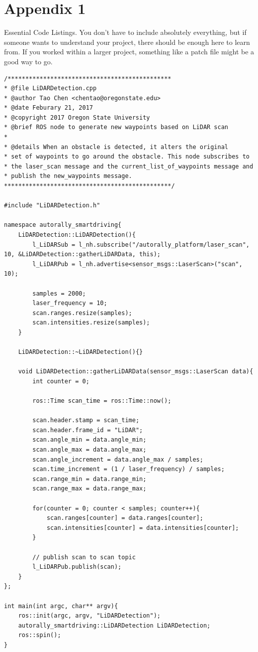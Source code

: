 \documentclass[compsoc,draftclsnofoot,onecolumn,10pt]{IEEEtran}
\begin{document}
\section{Appendix 1}
Essential Code Listings. You don't have to include absolutely everything, but if someone wants to understand your project, there should be enough here to learn from. If you worked within a larger project, something like a patch file might be a good way to go.
\begin{lstlisting}[frame=single,caption={Example Custom ROS Node}]
/**********************************************
* @file LiDARDetection.cpp
* @author Tao Chen <chentao@oregonstate.edu>
* @date Feburary 21, 2017
* @copyright 2017 Oregon State University
* @brief ROS node to generate new waypoints based on LiDAR scan
*
* @details When an obstacle is detected, it alters the original
* set of waypoints to go around the obstacle. This node subscribes to
* the laser_scan message and the current_list_of_waypoints message and
* publish the new_waypoints message.
***********************************************/

#include "LiDARDetection.h"

namespace autorally_smartdriving{
	LiDARDetection::LiDARDetection(){
		l_LiDARSub = l_nh.subscribe("/autorally_platform/laser_scan", 10, &LiDARDetection::gatherLiDARData, this);
		l_LiDARPub = l_nh.advertise<sensor_msgs::LaserScan>("scan", 10);

		samples = 2000;
		laser_frequency = 10;
		scan.ranges.resize(samples);
		scan.intensities.resize(samples);
	}

	LiDARDetection::~LiDARDetection(){}

	void LiDARDetection::gatherLiDARData(sensor_msgs::LaserScan data){
		int counter = 0;

		ros::Time scan_time = ros::Time::now();

		scan.header.stamp = scan_time;
		scan.header.frame_id = "LiDAR";
		scan.angle_min = data.angle_min;
		scan.angle_max = data.angle_max;
		scan.angle_increment = data.angle_max / samples;
		scan.time_increment = (1 / laser_frequency) / samples;
		scan.range_min = data.range_min;
		scan.range_max = data.range_max;

		for(counter = 0; counter < samples; counter++){
			scan.ranges[counter] = data.ranges[counter];
			scan.intensities[counter] = data.intensities[counter];
		}

		// publish scan to scan topic
		l_LiDARPub.publish(scan);
	}
};

int main(int argc, char** argv){
	ros::init(argc, argv, "LiDARDetection");
	autorally_smartdriving::LiDARDetection LiDARDetection;
	ros::spin();
}
\end{lstlisting}
\end{document}
